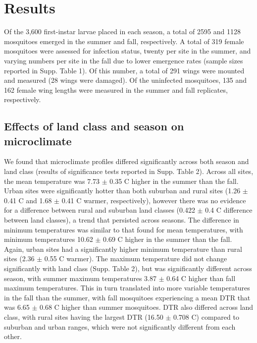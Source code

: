 \documentclass[12pt]{article}
\begin{document}
\section{Results}

Of the 3,600 first-instar larvae placed in each season, a total of 2595 and 1128 mosquitoes emerged in the summer and fall, respectively. A total of 319 female mosquitoes were assessed for infection status, twenty per site in the summer, and varying numbers per site in the fall due to lower emergence rates (sample sizes reported in Supp. Table 1). Of this number, a total of 291 wings were mounted and measured (28 wings were damaged). Of the uninfected mosquitoes, 135 and 162 female wing lengths were measured in the summer and fall replicates, respectively.

\subsection{Effects of land class and season on microclimate}

We found that microclimate profiles differed significantly across both season and land class (results of significance tests reported in Supp. Table 2). Across all sites, the mean temperature was 7.73 $\pm$ 0.35 \degree C higher in the summer than the fall. Urban sites were significantly hotter than both suburban and rural sites (1.26 $\pm$ 0.41 \degree C and 1.68 $\pm$ 0.41 \degree C warmer, respectively), however there was no evidence for a difference between rural and suburban land classes (0.422 $\pm$ 0.4 \degree C difference between land classes), a trend that persisted across seasons. The difference in minimum temperatures was similar to that found for mean temperatures, with minimum temperatures 10.62 $\pm$ 0.69 \degree C higher in the summer than the fall. Again, urban sites had a significantly higher minimum temperature than rural sites (2.36 $\pm$ 0.55 \degree C warmer). The maximum temperature did not change significantly with land class (Supp. Table 2), but was significantly different across season, with summer maximum temperatures 3.87 $\pm$ 0.64 \degree C higher than fall maximum temperatures. This in turn translated into more variable temperatures in the fall than the summer, with fall mosquitoes experiencing a mean DTR that was 6.65 $\pm$ 0.68 \degree C higher than summer mosquitoes. DTR also differed across land class, with rural sites having the largest DTR (16.50 $\pm$ 0.708 \degree C) compared to suburban and urban ranges, which were not significantly different from each other.
\end{document}

